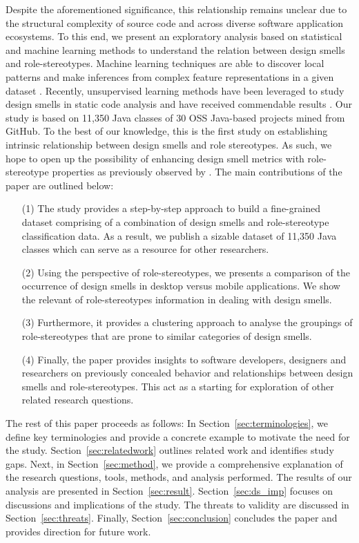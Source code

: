 \documentclass[AMA,Times1COL]{WileyNJDv5} %
\begin{document}
Despite the aforementioned significance, this relationship remains unclear due to  the structural complexity of source code and across diverse software application ecosystems. To this end, we present an exploratory analysis based on statistical and machine learning methods to understand the relation between design smells and role-stereotypes. Machine learning techniques are able to discover local patterns and make inferences from complex feature representations in a given dataset \cite{awad2015machine}. Recently, unsupervised learning methods have been leveraged to study design smells in static code analysis and have received commendable results \cite{caram2019machine,imran2019design,palomba2017investigating,tahmid2016understanding}. Our study is based on 11,350 Java classes of 30 OSS Java-based projects mined from GitHub. To the best of our knowledge, this is the first study on establishing intrinsic relationship between design smells and role stereotypes.
As such, we hope to open up the possibility of enhancing design smell metrics with role-stereotype properties as previously observed by \cite{nurwidyantoro2019automated}. The main contributions of the paper are outlined below:
\begin{itemize}
	\item [(1)] The study provides a step-by-step approach to build a fine-grained dataset comprising of a combination of design smells and role-stereotype classification data. As a result, we publish a sizable dataset of 11,350 Java classes which can serve as a resource for other researchers.
	\item [(2)] Using the perspective of role-stereotypes, we presents a comparison of the occurrence of design smells in desktop versus mobile applications. We show the relevant of role-stereotypes information in dealing with design smells.
	\item [(3)]Furthermore, it provides a clustering approach to analyse the groupings of role-stereotypes that are prone to similar categories of design smells.
	\item [(4)] Finally, the paper provides insights to software developers, designers and researchers on previously concealed behavior and relationships between design smells and role-stereotypes. This act as a starting for exploration of other related research questions.
\end{itemize}

The rest of this paper proceeds as follows: In Section~\ref{sec:terminologies}, we define key terminologies and provide a concrete example to motivate the need for the study. Section~\ref{sec:relatedwork} outlines related work and identifies study gaps. Next, in Section~\ref{sec:method}, we provide a comprehensive explanation of the research questions, tools, methods, and analysis performed. The results of our analysis are presented in Section~\ref{sec:result}. Section~\ref{sec:ds_imp} focuses on discussions and implications of the study. The threats to validity are discussed in Section~\ref{sec:threats}. Finally, Section~\ref{sec:conclusion} concludes the paper and provides direction for future work.
\end{document}
